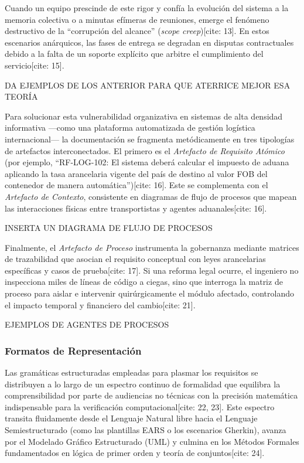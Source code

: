 \documentclass[11pt,a4paper]{article}
\begin{document}
	Cuando un equipo prescinde de este rigor y confía la evolución del sistema a la memoria colectiva o a minutas efímeras de reuniones, emerge el fenómeno destructivo de la ``corrupción del alcance'' (\textit{scope creep})[cite: 13]. En estos escenarios anárquicos, las fases de entrega se degradan en disputas contractuales debido a la falta de un soporte explícito que arbitre el cumplimiento del servicio[cite: 15]. 
	
	
	DA EJEMPLOS DE LOS ANTERIOR PARA QUE ATERRICE MEJOR ESA TEORÍA
	
	Para solucionar esta vulnerabilidad organizativa en sistemas de alta densidad informativa —como una plataforma automatizada de gestión logística internacional— la documentación se fragmenta metódicamente en tres tipologías de artefactos interconectados. El primero es el \textit{Artefacto de Requisito Atómico} (por ejemplo, ``RF-LOG-102: El sistema deberá calcular el impuesto de aduana aplicando la tasa arancelaria vigente del país de destino al valor FOB del contenedor de manera automática'')[cite: 16]. Este se complementa con el \textit{Artefacto de Contexto}, consistente en diagramas de flujo de procesos que mapean las interacciones físicas entre transportistas y agentes aduanales[cite: 16]. 
	
	INSERTA UN DIAGRAMA DE FLUJO DE PROCESOS
	
	Finalmente, el \textit{Artefacto de Proceso} instrumenta la gobernanza mediante matrices de trazabilidad que asocian el requisito conceptual con leyes arancelarias específicas y casos de prueba[cite: 17]. Si una reforma legal ocurre, el ingeniero no inspecciona miles de líneas de código a ciegas, sino que interroga la matriz de proceso para aislar e intervenir quirúrgicamente el módulo afectado, controlando el impacto temporal y financiero del cambio[cite: 21].
	
	EJEMPLOS DE AGENTES DE PROCESOS
	
	
	\subsubsection{Formatos de Representación}
	Las gramáticas estructuradas empleadas para plasmar los requisitos se distribuyen a lo largo de un espectro continuo de formalidad que equilibra la comprensibilidad por parte de audiencias no técnicas con la precisión matemática indispensable para la verificación computacional[cite: 22, 23]. Este espectro transita fluidamente desde el Lenguaje Natural libre hacia el Lenguaje Semiestructurado (como las plantillas EARS o los escenarios Gherkin), avanza por el Modelado Gráfico Estructurado (UML) y culmina en los Métodos Formales fundamentados en lógica de primer orden y teoría de conjuntos[cite: 24].
	
\end{document}
